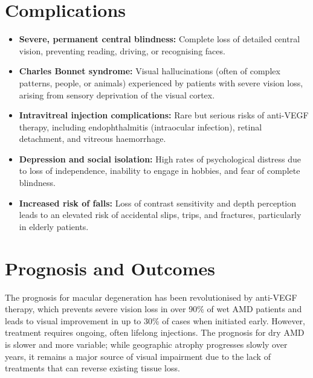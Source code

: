 \section*{Complications}
\begin{itemize}
    \item \textbf{Severe, permanent central blindness:} Complete loss of detailed central vision, preventing reading, driving, or recognising faces.
    \item \textbf{Charles Bonnet syndrome:} Visual hallucinations (often of complex patterns, people, or animals) experienced by patients with severe vision loss, arising from sensory deprivation of the visual cortex.
    \item \textbf{Intravitreal injection complications:} Rare but serious risks of anti-VEGF therapy, including endophthalmitis (intraocular infection), retinal detachment, and vitreous haemorrhage.
    \item \textbf{Depression and social isolation:} High rates of psychological distress due to loss of independence, inability to engage in hobbies, and fear of complete blindness.
    \item \textbf{Increased risk of falls:} Loss of contrast sensitivity and depth perception leads to an elevated risk of accidental slips, trips, and fractures, particularly in elderly patients.
\end{itemize}

\section*{Prognosis and Outcomes}
The prognosis for macular degeneration has been revolutionised by anti-VEGF therapy, which prevents severe vision loss in over 90\% of wet AMD patients and leads to visual improvement in up to 30\% of cases when initiated early. However, treatment requires ongoing, often lifelong injections. The prognosis for dry AMD is slower and more variable; while geographic atrophy progresses slowly over years, it remains a major source of visual impairment due to the lack of treatments that can reverse existing tissue loss.

